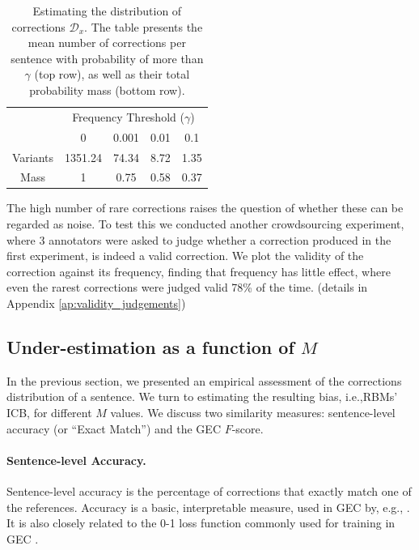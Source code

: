 \documentclass[a4paper, 11pt]{article}
\begin{document}
\begin{table}[h!]
	\vspace{-0.5cm}
  \centering
  \small
  \singlespacing
  \begin{tabular}{c|c|c|c|c|}
    & \multicolumn{4}{c|}{Frequency Threshold ($\gamma$)}\\ 
    & \multicolumn{1}{c}{0} & \multicolumn{1}{c}{0.001} & \multicolumn{1}{c}{0.01} & \multicolumn{1}{c|}{0.1}
    \\
    \hline
    Variants & 1351.24 & 74.34 & 8.72 & 1.35
    \\
    Mass & 1 & 0.75 & 0.58 & 0.37\\
    \hline
  \end{tabular}
  \caption{\label{tab:corrections_dist}
    Estimating the distribution of corrections $\mathcal{D}_x$.
    The table presents the mean number of corrections per sentence with probability of more than
    $\gamma$ (top row), as well as their total probability mass (bottom row).
  }
  \vspace{-0.3cm}
\end{table}

The high number of rare corrections raises the question of whether these can be regarded as noise.
To test this we conducted another crowdsourcing experiment, where 3 annotators were asked to judge whether a correction produced in the first experiment, is indeed a valid correction.
We plot the validity of the correction against its frequency, finding that frequency has little effect,
where even the rarest corrections were judged valid 78\% of the time.
(details in Appendix \ref{ap:validity_judgements})

\subsection{Under-estimation as a function of $M$} \label{subsec:Assessment-values}
In the previous section, we presented an empirical assessment of the corrections distribution of a sentence. We turn to estimating the resulting bias, i.e.,RBMs' ICB, for different $M$ values. 
We discuss two similarity measures: sentence-level accuracy
(or ``Exact Match'') and the GEC $F$-score.

\paragraph{Sentence-level Accuracy.}
Sentence-level accuracy is the percentage of corrections that
exactly match one of the references.
Accuracy is a basic, interpretable measure, used in GEC by, e.g., .
It is also closely related to the 0-1 loss function commonly used
for training in GEC \cite{chodorow2012problems,rozovskaya2013joint}. 
\end{document}
